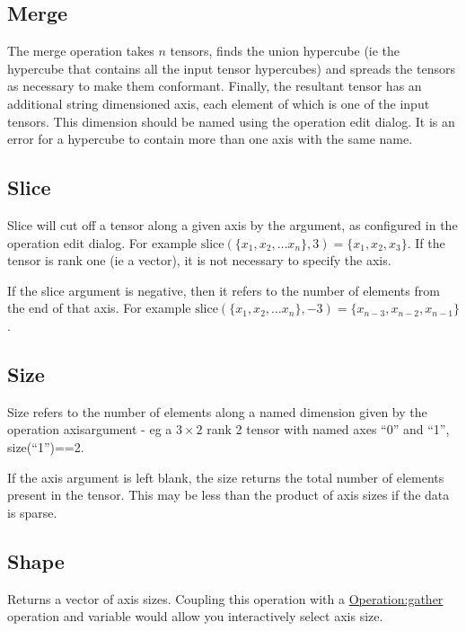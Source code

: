 \subsection{Merge}\label{Operation:merge}

The merge operation takes $n$ tensors, finds the union hypercube (ie
the hypercube that contains all the input tensor hypercubes) and
spreads the tensors as necessary to make them conformant. Finally,
the resultant tensor has an additional string dimensioned axis, each
element of which is one of the input tensors. This dimension should be
named using the operation edit dialog. It is an error for a hypercube
to contain more than one axis with the same name.

\subsection{Slice}\label{Operation:slice}

Slice will cut off a tensor along a given axis by the argument, as
configured in the operation edit dialog. For
example $\mathrm{slice}(\{x_1,x_2,\ldots x_n\},
  3)=\{x_1,x_2,x_3\}$. If the tensor is rank one (ie a vector), it is
  not necessary to specify the axis.

If the slice argument is negative, then it refers to the number of
elements from the end of that axis. For example $\mathrm{slice}(\{x_1,x_2,\ldots x_n\},
  -3)=\{x_{n-3},x_{n-2},x_{n-1}\}$.

\subsection{Size}\label{Operation:size}

Size refers to the number of elements along a named dimension given by
the operation axisargument - eg a $3\times2$ rank 2 tensor with named
axes ``0'' and ``1'', size(``1'')==2.

If the axis argument is left blank, the size returns the total number
of elements present in the tensor. This may be less than the product
of axis sizes if the data is sparse.

\subsection{Shape}\label{Operation:shape}

Returns a vector of axis sizes. Coupling this operation with a
\hyperref{gather}{gather (\S}{)}{Operation:gather} operation
and variable would allow you interactively select axis size.

